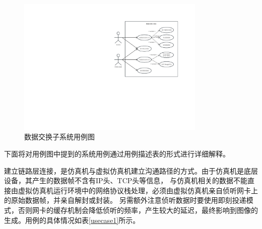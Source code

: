 \begin{figure}[h!]
    \begin{center}
        \includegraphics[width=0.8\textwidth]{pictures/usecase.pdf}
        \caption{数据交换子系统用例图}
        \label{usecase}
    \end{center}
\end{figure}

\par
下面将对用例图中提到的系统用例通过用例描述表的形式进行详细解释。
\par
建立链路层连接，是仿真机与虚拟仿真机建立沟通路径的方式。由于仿真机是底层设备，其产生的数据帧不含有IP头、TCP头等信息，
与仿真机相关的数据不能直接由虚拟仿真机运行环境中的网络协议栈处理，必须由虚拟仿真机亲自侦听网卡上的原始数据帧，并亲自解封或封装。
另需额外注意侦听数据时要使用即刻投递模式，否则网卡的缓存机制会降低侦听的频率，产生较大的延迟，最终影响到图像的生成。用例的具体情况如表\ref{usecase1}所示。

